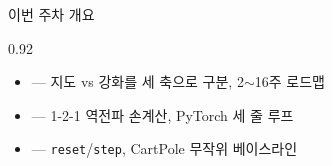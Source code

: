 \begin{frame}{이번 주차 개요}
\begin{center}\begin{varwidth}{0.92\textwidth}
  \begin{itemize}
    \item {} — 지도 vs 강화를 세 축으로 구분, 2$\sim$16주 로드맵
    \item {} — 1-2-1 역전파 손계산, PyTorch 세 줄 루프
    \item {} — \texttt{reset}/\texttt{step}, CartPole 무작위 베이스라인
  \end{itemize}
\end{varwidth}\end{center}
\end{frame}
